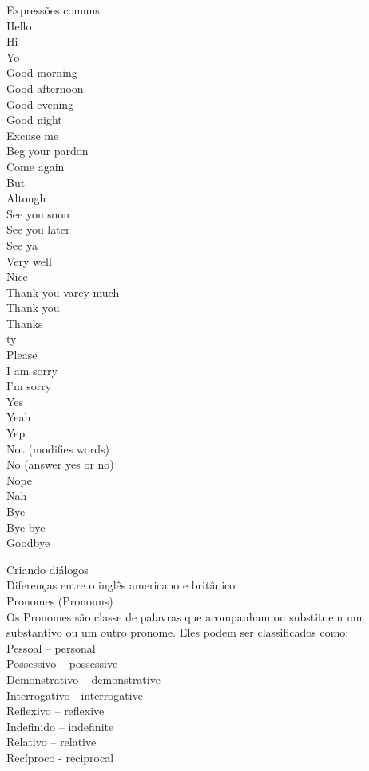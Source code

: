 \documentclass[12pt,a4paper]{article} %
\begin{document}
Expressões comuns\\
Hello\\
Hi\\
Yo\\
Good morning\\
Good afternoon\\
Good evening\\
Good night\\
Excuse me\\
Beg your pardon\\
Come again\\
But\\
Altough\\
See you soon\\
See you later\\
See ya\\
Very well\\
Nice\\
Thank you varey much\\
Thank you\\
Thanks\\
ty\\
Please\\
I am sorry\\
I'm sorry\\
Yes\\
Yeah\\
Yep\\
Not (modifies words)\\
No (answer yes or no)\\
Nope\\
Nah\\
Bye\\
Bye bye\\
Goodbye

Criando diálogos\\

Diferenças entre o inglês americano e britânico\\

Pronomes (Pronouns)\\
Os Pronomes são classe de palavras que acompanham ou substituem um substantivo ou um outro pronome. Eles 	podem ser classificados como:\\
Pessoal – personal\\
Possessivo – possessive\\
Demonstrativo – demonstrative\\
Interrogativo - interrogative\\
Reflexivo – reflexive\\
Indefinido – indefinite\\
Relativo – relative\\
Recíproco - reciprocal\\
\end{document}
